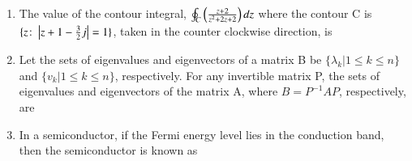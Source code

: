 \documentclass[a4paper, 11pt]{article}
\begin{document}
\begin{enumerate}
    \hfill{}
    
    \item The value of the contour integral, $\oint_C \left(\frac{z+2}{z^2+2z+2}\right)dz$ where the contour C is $\{z \colon \left\vert z+1-\frac{3}{2}j\right\vert=1\}$, taken in the counter clockwise direction, is
    
    \begin{enumerate}
    \end{enumerate}
    
    \hfill{}
    
    \item Let the sets of eigenvalues and eigenvectors of a matrix B be $\{\lambda_k | 1 \le k \le n\}$ and $\{v_k | 1 \le k \le n\}$, respectively. For any invertible matrix P, the sets of eigenvalues and eigenvectors of the matrix A, where $B = P^{-1}AP$, respectively, are
    
    \begin{enumerate}
    \end{enumerate}
    
    \hfill{}
    
    \item In a semiconductor, if the Fermi energy level lies in the conduction band, then the semiconductor is known as
    
    \begin{enumerate}
    \end{enumerate}
    

\end{enumerate}
\end{document}
